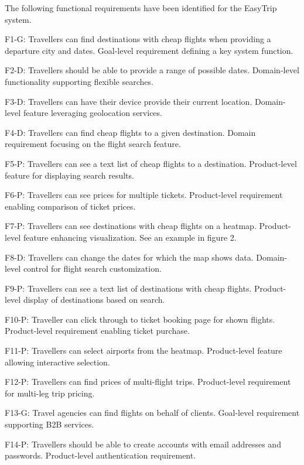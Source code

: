 The following functional requirements have been identified for the EasyTrip system.

F1-G: Travellers can find destinations with cheap flights when providing a departure city and dates.
    Goal-level requirement defining a key system function.
    
F2-D: Travellers should be able to provide a range of possible dates.
    Domain-level functionality supporting flexible searches.
    
F3-D: Travellers can have their device provide their current location.
    Domain-level feature leveraging geolocation services.
    
F4-D: Travellers can find cheap flights to a given destination.
    Domain requirement focusing on the flight search feature.
    
F5-P: Travellers can see a text list of cheap flights to a destination.
    Product-level feature for displaying search results.
    
F6-P: Travellers can see prices for multiple tickets.
    Product-level requirement enabling comparison of ticket prices.

F7-P: Travellers can see destinations with cheap flights on a heatmap.
    Product-level feature enhancing visualization. See an example in figure 2.

F8-D: Travellers can change the dates for which the map shows data.
    Domain-level control for flight search customization.

F9-P: Travellers can see a text list of destinations with cheap flights.
    Product-level display of destinations based on search.

F10-P: Traveller can click through to ticket booking page for shown flights.
    Product-level requirement enabling ticket purchase.

F11-P: Travellers can select airports from the heatmap.
    Product-level feature allowing interactive selection.

F12-P: Travellers can find prices of multi-flight trips.
    Product-level requirement for multi-leg trip pricing.

F13-G: Travel agencies can find flights on behalf of clients.
    Goal-level requirement supporting B2B services.

F14-P: Travellers should be able to create accounts with email addresses and passwords.
    Product-level authentication requirement.

